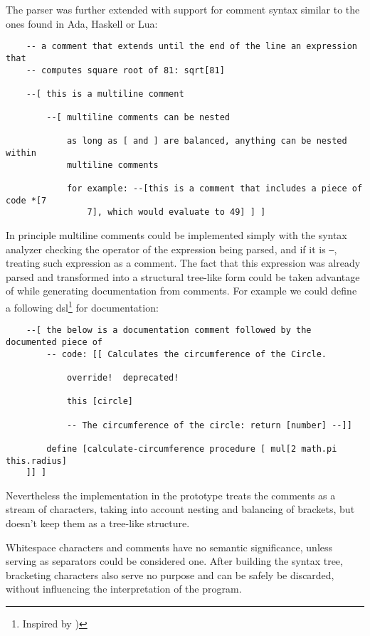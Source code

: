 The parser was further extended with support for comment syntax similar to the
ones found in Ada, Haskell or Lua:
\begin{lstlisting}
    -- a comment that extends until the end of the line an expression that
    -- computes square root of 81: sqrt[81]
    
    --[ this is a multiline comment
        
        --[ multiline comments can be nested
            
            as long as [ and ] are balanced, anything can be nested within
            multiline comments
            
            for example: --[this is a comment that includes a piece of code *[7
                7], which would evaluate to 49] ] ]
\end{lstlisting}

In principle multiline comments could be implemented simply with the syntax
analyzer checking the operator of the expression being parsed, and if it is
\texttt{--}, treating such expression as a comment. The fact that this
expression was already parsed and transformed into a structural tree-like form
could be taken advantage of while generating documentation from comments. For
example we could define a following \acrlong{dsl}\footnote{Inspired by
  \cite{jsdoc_wikipedia})} for documentation:
\begin{lstlisting}
    --[ the below is a documentation comment followed by the documented piece of
        -- code: [[ Calculates the circumference of the Circle.
            
            override!  deprecated!
            
            this [circle]
            
            -- The circumference of the circle: return [number] --]]
        
        define [calculate-circumference procedure [ mul[2 math.pi this.radius]
    ]] ]
\end{lstlisting}

Nevertheless the implementation in the prototype treats the comments as a stream
of characters, taking into account nesting and balancing of brackets, but
doesn't keep them as a tree-like structure.

Whitespace characters and comments have no semantic significance, unless serving
as separators could be considered one. After building the syntax tree,
bracketing characters also serve no purpose and can be safely be discarded,
without influencing the interpretation of the program.

